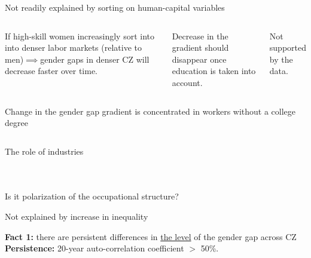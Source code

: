 \begin{frame}{Not readily explained by sorting on human-capital variables}
 	\begin{columns}
 		\bitem
	 		\item If high-skill women increasingly sort into into denser labor markets (relative to men)$\implies$gender gaps in denser CZ will decrease faster over time.
	 		\bitem
	 		\item Decrease in the gradient should disappear once education is taken into account.
	 		\item Not supported by the data.
	 		\eitem 
 		\eitem 
		 { \tiny	}
 	\end{columns}
\end{frame}
\begin{frame}{Change in the gender gap gradient is concentrated in workers without a college degree}
	\begin{columns}
		\column{0.5\textwidth}
		\column{0.5\textwidth}
	\end{columns} 
\end{frame}

\begin{frame}{The role of industries}
	\begin{columns}

	{ \tiny	}
\end{columns}
\end{frame}
\begin{frame}{Is it polarization of the occupational structure?}
	\bitem
	\item 
	\eitem 
\end{frame}
\begin{frame}{Not explained by increase in inequality}
	\bitem
	\item 
	\eitem 
\end{frame}


\begin{frame}{\textbf{Fact 1:} there are persistent differences in \underline{the level} of the gender gap across CZ} 
\label{slide:fact1}
{\scriptsize}
\textbf{\alert{Persistence:}} 20-year auto-correlation coefficient $>$ 50\%.

\hspace{1cm} 
\end{frame}

